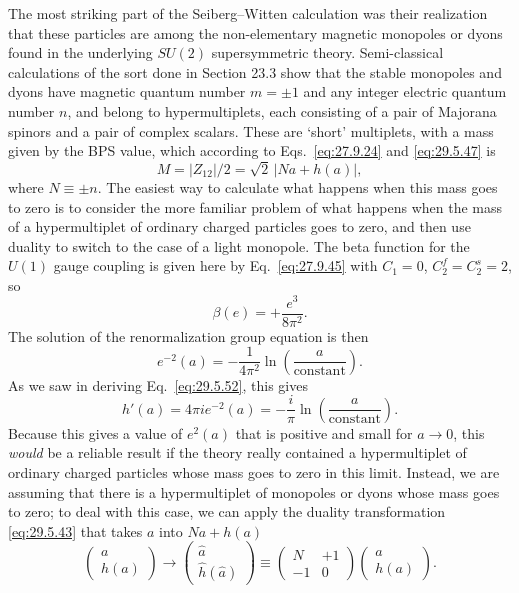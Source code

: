 The most striking part of the Seiberg--Witten calculation was their
realization that these particles are among the non-elementary magnetic
monopoles or dyons found in the underlying \(SU(2)\) supersymmetric theory.
Semi-classical calculations of the sort done in Section 23.3 show that the
stable monopoles and dyons have magnetic quantum number \(m=\pm1\) and any
integer electric quantum number \(n\), and belong to hypermultiplets, each
consisting of a pair of Majorana spinors and a pair of complex scalars.
These are `short' multiplets, with a mass given by the BPS value, which
according to Eqs.~\eqref{eq:27.9.24} and \eqref{eq:29.5.47} is
\begin{equation}
  M=\lvert Z_{12}\rvert/2
  =\sqrt{2}\,\lvert Na+h(a)\rvert,
  \tag{29.5.58}\label{eq:29.5.58}
\end{equation}
where \(N\equiv\pm n\). The easiest way to calculate what happens when this
mass goes to zero is to consider the more familiar problem of what happens
when the mass of a hypermultiplet of ordinary charged particles goes to
zero, and then use duality to switch to the case of a light monopole. The
beta function for the \(U(1)\) gauge coupling is given here by
Eq.~\eqref{eq:27.9.45} with \(C_1=0\), \(C_2^f=C_2^s=2\), so
\[
  \beta(e)=+\frac{e^3}{8\pi^2}.
\]
The solution of the renormalization group equation is then
\[
  e^{-2}(a)
  =-\frac{1}{4\pi^2}\ln\left(\frac{a}{\text{constant}}\right).
\]
As we saw in deriving Eq.~\eqref{eq:29.5.52}, this gives
\[
  h'(a)=4\pi i e^{-2}(a)
  =-\frac{i}{\pi}\ln\left(\frac{a}{\text{constant}}\right).
\]
Because this gives a value of \(e^2(a)\) that is positive and small for
\(a\longrightarrow0\), this \textit{would} be a reliable result if the
theory really contained a hypermultiplet of ordinary charged particles whose
mass goes to zero in this limit. Instead, we are assuming that there is a
hypermultiplet of monopoles or dyons whose mass goes to zero; to deal with
this case, we can apply the duality transformation \eqref{eq:29.5.43} that
takes \(a\) into \(Na+h(a)\)
\begin{equation}
  \begin{pmatrix}
    a\\ h(a)
  \end{pmatrix}
  \longrightarrow
  \begin{pmatrix}
    \widehat a\\ \widehat h(\widehat a)
  \end{pmatrix}
  \equiv
  \begin{pmatrix}
    N&+1\\ -1&0
  \end{pmatrix}
  \begin{pmatrix}
    a\\ h(a)
  \end{pmatrix}.
  \tag{29.5.59}\label{eq:29.5.59}
\end{equation}
